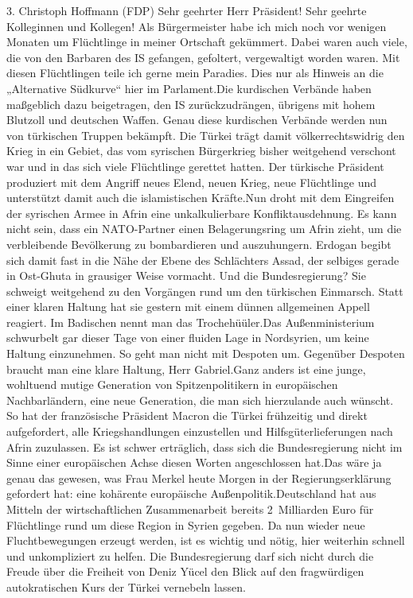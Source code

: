 \documentclass{article}
\begin{document}
	3. Christoph Hoffmann (FDP) Sehr geehrter Herr Präsident! Sehr geehrte Kolleginnen und Kollegen! Als Bürgermeister habe ich mich noch vor wenigen Monaten um Flüchtlinge in meiner Ortschaft gekümmert. Dabei waren auch viele, die von den Barbaren des IS gefangen, gefoltert, vergewaltigt worden waren. Mit diesen Flüchtlingen teile ich gerne mein Paradies. Dies nur als Hinweis an die „Alternative Südkurve“ hier im Parlament.Die kurdischen Verbände haben maßgeblich dazu beigetragen, den IS zurückzudrängen, übrigens mit hohem Blutzoll und deutschen Waffen. Genau diese kurdischen Verbände werden nun von türkischen Truppen bekämpft. Die Türkei trägt damit völkerrechtswidrig den Krieg in ein Gebiet, das vom syrischen Bürgerkrieg bisher weitgehend verschont war und in das sich viele Flüchtlinge gerettet hatten. Der türkische Präsident produziert mit dem Angriff neues Elend, neuen Krieg, neue Flüchtlinge und unterstützt damit auch die islamistischen Kräfte.Nun droht mit dem Eingreifen der syrischen Armee in Afrin eine unkalkulierbare Konfliktausdehnung. Es kann nicht sein, dass ein NATO-Partner einen Belagerungsring um Afrin zieht, um die verbleibende Bevölkerung zu bombardieren und auszuhungern. Erdogan begibt sich damit fast in die Nähe der Ebene des Schlächters Assad, der selbiges gerade in Ost-Ghuta in grausiger Weise vormacht. Und die Bundesregierung? Sie schweigt weitgehend zu den Vorgängen rund um den türkischen Einmarsch. Statt einer klaren Haltung hat sie gestern mit einem dünnen allgemeinen Appell reagiert. Im Badischen nennt man das Trochehüüler.Das Außenministerium schwurbelt gar dieser Tage von einer fluiden Lage in Nordsyrien, um keine Haltung einzunehmen. So geht man nicht mit Despoten um. Gegenüber Despoten braucht man eine klare Haltung, Herr Gabriel.Ganz anders ist eine junge, wohltuend mutige Generation von Spitzenpolitikern in europäischen Nachbarländern, eine neue Generation, die man sich hierzulande auch wünscht. So hat der französische Präsident Macron die Türkei frühzeitig und direkt aufgefordert, alle Kriegshandlungen einzustellen und Hilfsgüterlieferungen nach Afrin zuzulassen. Es ist schwer erträglich, dass sich die Bundesregierung nicht im Sinne einer europäischen Achse diesen Worten angeschlossen hat.Das wäre ja genau das gewesen, was Frau Merkel heute Morgen in der Regierungserklärung gefordert hat: eine kohärente europäische Außenpolitik.Deutschland hat aus Mitteln der wirtschaftlichen Zusammenarbeit bereits 2 Milliarden Euro für Flüchtlinge rund um diese Region in Syrien gegeben. Da nun wieder neue Fluchtbewegungen erzeugt werden, ist es wichtig und nötig, hier weiterhin schnell und unkompliziert zu helfen. Die Bundesregierung darf sich nicht durch die Freude über die Freiheit von Deniz Yücel den Blick auf den fragwürdigen autokratischen Kurs der Türkei vernebeln lassen.
\end{document}
